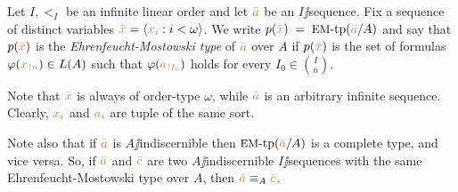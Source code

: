 \documentclass[creche.tex]{subfiles}
\begin{document}
Let $I,<_I$ be an infinite linear order and let ${\color{brown}\bar a}$ be an $I\jj$sequence. Fix a sequence of distinct variables ${\color{brown}\bar x}=\langle{\color{brown}x_i}: i<\omega\rangle$. We write \emph{$p({\color{brown}\bar x})\;=\;\textrm{{\small EM}-tp}({\color{brown}\bar a}/A)$} and say that $p({\color{brown}\bar x})$ is the \emph{Ehren\-feucht-Mostowski type\/} of ${\color{brown}\bar a}$ over $A$ if $p({\color{brown}\bar x})$ is the set of formulas $\varphi({\color{brown} x_{\restriction n}})\in L(A)$ such that $\varphi({\color{brown} a_{\restriction I_0}})$ holds for every $I_0\in{I\choose n}$. 

Note that ${\color{brown}\bar x}$ is always of order-type $\omega$, while ${\color{brown}\bar a}$ is an arbitrary infinite sequence. Clearly, ${\color{brown} x_i}$ and  ${\color{brown} a_i}$ are tuple of the same sort.

Note also that if ${\color{brown}\bar a}$ is $A\jj$indiscernible then $\textrm{{\small EM}\mbox{-}tp}({\color{brown}\bar a}/A)$ is a complete type, and vice versa. So, if ${\color{brown}\bar a}$ and ${\color{brown}\bar c}$ are two $A\jj$indiscernible $I\jj$sequences with the same Ehren\-feucht-Mostowski type over $A$, then ${\color{brown}\bar a}\equiv_A {\color{brown}\bar c}$.
 
\end{document}
